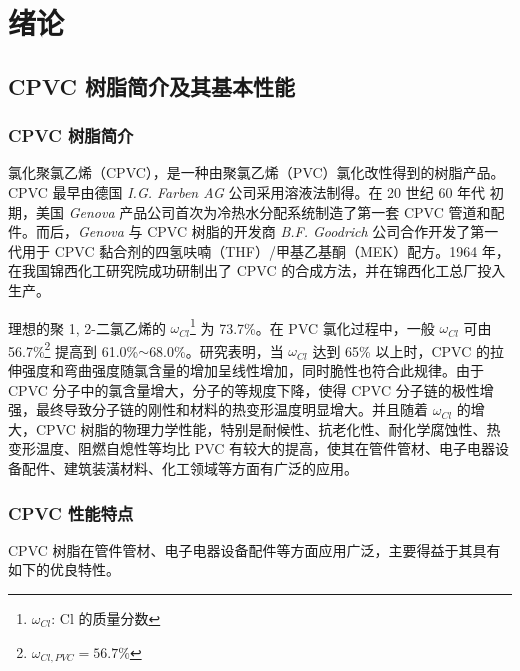 \chapter{绪论}
\setcounter{page}{1}

\section{CPVC 树脂简介及其基本性能}

\subsection{CPVC 树脂简介}
氯化聚氯乙烯（CPVC），是一种由聚氯乙烯（PVC）氯化改性得到的树脂产品。CPVC 最早由德国 \textit{I.G. Farben AG} 公司采用溶液法制得。在 20 世纪 60 年代 初期，美国 \textit{Genova} 产品公司首次为冷热水分配系统制造了第一套 CPVC 管道和配件。而后，\textit{Genova} 与 CPVC 树脂的开发商 \textit{B.F. Goodrich} 公司合作开发了第一代用于 CPVC 黏合剂的四氢呋喃（THF）/甲基乙基酮（MEK）配方。1964 年，在我国锦西化工研究院成功研制出了 CPVC 的合成方法，并在锦西化工总厂投入生产。\par
理想的聚 1, 2-二氯乙烯的 $\omega_{Cl}$\footnote{$\omega_{Cl}$: Cl 的质量分数} 为 73.7\%。在 PVC 氯化过程中，一般 $\omega_{Cl}$ 可由 56.7\%\footnote{$\omega_{Cl, PVC} = 56.7\%$} 提高到 61.0\%$\sim$68.0\%。研究表明，当 $\omega_{Cl}$ 达到 65\% 以上时，CPVC 的拉伸强度和弯曲强度随氯含量的增加呈线性增加，同时脆性也符合此规律。由于 CPVC 分子中的氯含量增大，分子的等规度下降，使得 CPVC 分子链的极性增强，最终导致分子链的刚性和材料的热变形温度明显增大\cite{14}。并且随着 $\omega_{Cl}$ 的增大，CPVC 树脂的物理力学性能，特别是耐候性、抗老化性、耐化学腐蚀性、热变形温度、阻燃自熄性等均比 PVC 有较大的提高，使其在管件管材、电子电器设备配件、建筑装潢材料、化工领域等方面有广泛的应用\cite{19}。

\subsection{CPVC 性能特点}
CPVC 树脂在管件管材、电子电器设备配件等方面应用广泛，主要得益于其具有如下的优良特性。

